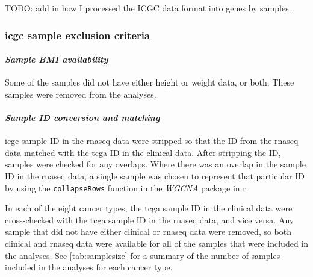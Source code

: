 TODO: add in how I processed the ICGC data format into genes by samples.


\subsubsection{\textbf{\gls{icgc} sample exclusion criteria}}
\label{subsec:icgcsampleexclusion}

\paragraph{\textit{Sample BMI availability}}
Some of the samples did not have either height or weight data, or both.
These samples were removed from the analyses.

\paragraph{\textit{Sample ID conversion and matching}}


\gls{icgc} sample ID in the \gls{rnaseq} data were stripped so that the ID from the \gls{rnaseq} data matched with the \gls{tcga} ID in the clinical data.
After stripping the ID, samples were checked for any overlaps.
Where there was an overlap in the sample ID in the \gls{rnaseq} data, a single sample was chosen to represent that particular ID by using the \texttt{collapseRows} function in the \textit{WGCNA} package in \gls{r}.

In each of the eight cancer types, the \gls{tcga} sample ID in the clinical data were cross-checked with the \gls{tcga} sample ID in the \gls{rnaseq} data, and vice versa.
Any sample that did not have either clinical or \gls{rnaseq} data were removed, so both clinical and \gls{rnaseq} data were available for all of the samples that were included in the analyses.
See \cref{tab:samplesize} for a summary of the number of samples included in the analyses for each cancer type.

